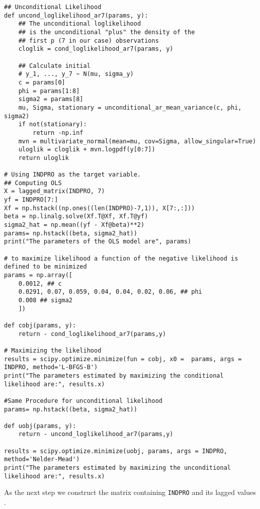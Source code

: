 \documentclass{article}
\begin{document}
\begin{verbatim}
## Unconditional Likelihood
def uncond_loglikelihood_ar7(params, y):
    ## The unconditional loglikelihood
    ## is the unconditional "plus" the density of the
    ## first p (7 in our case) observations
    cloglik = cond_loglikelihood_ar7(params, y)

    ## Calculate initial
    # y_1, ..., y_7 ~ N(mu, sigma_y)
    c = params[0] 
    phi = params[1:8]
    sigma2 = params[8]
    mu, Sigma, stationary = unconditional_ar_mean_variance(c, phi, sigma2)
    if not(stationary):
        return -np.inf
    mvn = multivariate_normal(mean=mu, cov=Sigma, allow_singular=True)
    uloglik = cloglik + mvn.logpdf(y[0:7])
    return uloglik
    
# Using INDPRO as the target variable.
## Computing OLS
X = lagged_matrix(INDPRO, 7)
yf = INDPRO[7:]
Xf = np.hstack((np.ones((len(INDPRO)-7,1)), X[7:,:]))
beta = np.linalg.solve(Xf.T@Xf, Xf.T@yf)
sigma2_hat = np.mean((yf - Xf@beta)**2)
params= np.hstack((beta, sigma2_hat))
print("The parameters of the OLS model are", params)

# to maximize likelihood a function of the negative likelihood is defined to be minimized
params = np.array([
    0.0012, ## c
    0.0291, 0.07, 0.059, 0.04, 0.04, 0.02, 0.06, ## phi
    0.008 ## sigma2    
    ])

def cobj(params, y): 
    return - cond_loglikelihood_ar7(params,y)

# Maximizing the likelihood
results = scipy.optimize.minimize(fun = cobj, x0 =  params, args = INDPRO, method='L-BFGS-B')
print("The parameters estimated by maximizing the conditional likelihood are:", results.x)

#Same Procedure for unconditional likelihood
params= np.hstack((beta, sigma2_hat))

def uobj(params, y): 
    return - uncond_loglikelihood_ar7(params,y)

results = scipy.optimize.minimize(uobj, params, args = INDPRO, method='Nelder-Mead')
print("The parameters estimated by maximizing the unconditional likelihood are:", results.x)

\end{verbatim}
As the next step we construct the matrix containing \texttt{INDPRO} and its lagged values .
\end{document}
